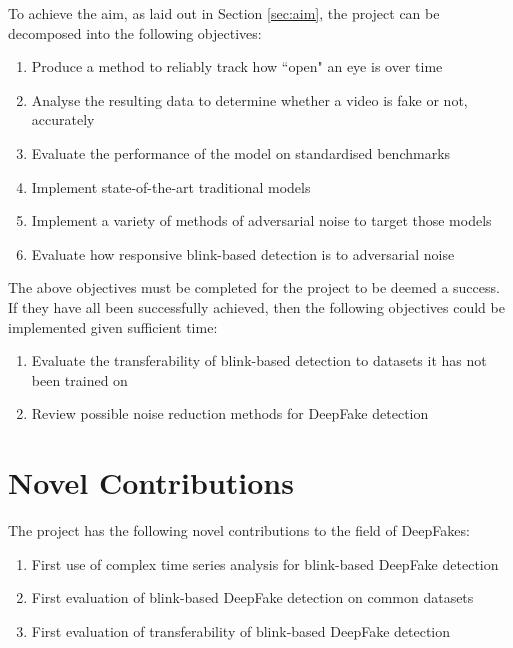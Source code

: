 To achieve the aim, as laid out in Section \ref{sec:aim}, the project can be decomposed into the following objectives:

\begin{enumerate}
    \item Produce a method to reliably track how ``open" an eye is over time
    \item Analyse the resulting data to determine whether a video is fake or not, accurately
    \item Evaluate the performance of the model on standardised benchmarks
    \item Implement state-of-the-art traditional models
    \item Implement a variety of methods of adversarial noise to target those models
    \item Evaluate how responsive blink-based detection is to adversarial noise
\end{enumerate}

The above objectives must be completed for the project to be deemed a success. If they have all been successfully achieved, then the following objectives could be implemented given sufficient time:

\begin{enumerate}
    \item Evaluate the transferability of blink-based detection to datasets it has not been trained on
    \item Review possible noise reduction methods for DeepFake detection
\end{enumerate}

\section{Novel Contributions}
\label{sec:novel}

The project has the following novel contributions to the field of DeepFakes:

\begin{enumerate}
    \item First use of complex time series analysis for blink-based DeepFake detection
    \item First evaluation of blink-based DeepFake detection on common datasets
    \item First evaluation of transferability of blink-based DeepFake detection
\end{enumerate}